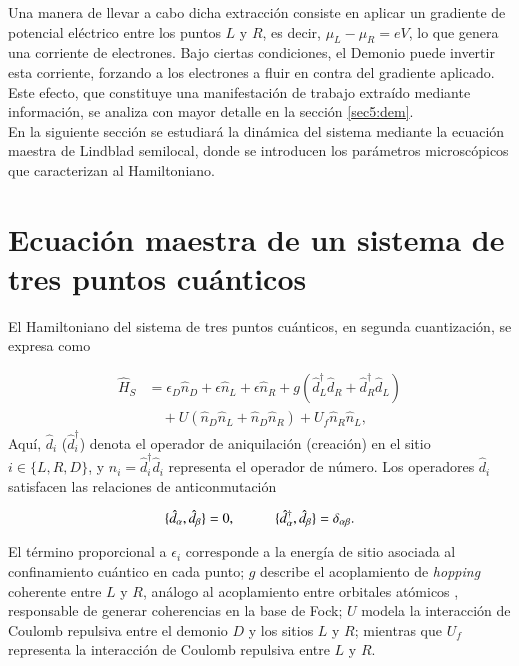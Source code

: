 Una manera de llevar a cabo dicha extracción consiste en aplicar un gradiente de potencial eléctrico entre los puntos $L$ y $R$, es decir, $\mu_{L} - \mu_{R} = eV$, lo que genera una corriente de electrones. Bajo ciertas condiciones, el Demonio puede invertir esta corriente, forzando a los electrones a fluir en contra del gradiente aplicado. Este efecto, que constituye una manifestación de trabajo extraído mediante información, se analiza con mayor detalle en la sección \ref{sec5:dem}. 
\\

En la siguiente sección se estudiará la dinámica del sistema mediante la ecuación maestra de Lindblad semilocal, donde se introducen los parámetros microscópicos que caracterizan al Hamiltoniano.

\section{Ecuación maestra de un sistema de tres puntos cuánticos}

El Hamiltoniano del sistema de tres puntos cuánticos, en segunda cuantización, se expresa como 

\begin{align*}
    \hat{H}_{S} & = \epsilon_{D}\hat{n}_{D} + \epsilon \hat{n}_{L} + \epsilon \hat{n}_{R} + g(\hat{d}^{\dagger}_{L}\hat{d}_{R} + \hat{d}^{\dagger}_{R}\hat{d}_{L} ) \\
          & \quad + U(\hat{n}_{D}\hat{n}_{L} + \hat{n}_{D}\hat{n}_{R} )  + U_{f}\hat{n}_{R}\hat{n}_{L},
\end{align*}
Aquí, $\hat{d}_{i}$ ($\hat{d}^{\dagger}_{i}$) denota el operador de aniquilación (creación) en el sitio $i\in\{L,R,D\}$, y $\hat{n}_{i}=\hat{d}^\dagger_i\hat{d}_i$ representa el operador de número. Los operadores $\hat{d}_{i}$ satisfacen las relaciones de anticonmutación

\begin{equation*}
    \{\hat{d}_{\alpha},\hat{d}_{\beta} \} = 0, \hspace{10mm} \{\hat{d}^{\dagger}_{\alpha}, \hat{d}_{\beta} \} = \delta_{\alpha \beta}.
\end{equation*}

El término proporcional a $\epsilon_i$ corresponde a la energía de sitio asociada al confinamiento cuántico en cada punto; $g$ describe el acoplamiento de \textit{hopping} coherente entre $L$ y $R$, análogo al acoplamiento entre orbitales atómicos \cite{simon2013oxford}, responsable de generar coherencias en la base de Fock; $U$ modela la interacción de Coulomb repulsiva entre el demonio $D$ y los sitios $L$ y $R$; mientras que $U_f$ representa la interacción de Coulomb repulsiva entre $L$ y $R$.
\\

